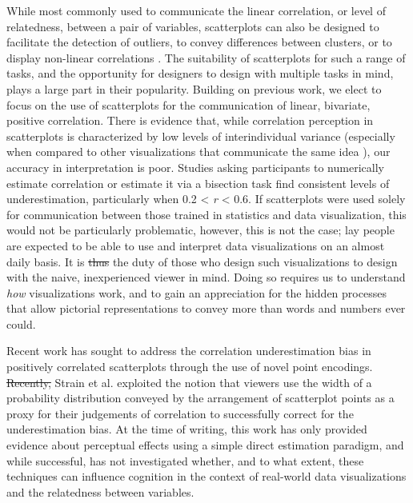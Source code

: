 \documentclass[manuscript,screen,review,anonymous]{acmart}
\providecommand{\DIFaddtex}[1]{{\protect\color{blue}\uwave{#1}}} %
\providecommand{\DIFdeltex}[1]{{\protect\color{red}\sout{#1}}} %
\providecommand{\DIFaddbegin}{} %
\providecommand{\DIFaddend}{} %
\providecommand{\DIFdelbegin}{} %
\providecommand{\DIFdelend}{} %
\providecommand{\DIFadd}[1]{\texorpdfstring{\DIFaddtex{#1}}{#1}} %
\providecommand{\DIFdel}[1]{\texorpdfstring{\DIFdeltex{#1}}{}} %
\newcommand{\DIFscaledelfig}{0.5}
\newlength{\DIFdelgraphicswidth} %
\newlength{\DIFdelgraphicsheight} %
\newcommand{\DIFaddincludegraphics}[2][]{{\color{blue}\fbox{\DIFOincludegraphics[#1]{#2}}}} %
\newcommand{\DIFdelincludegraphics}[2][]{%
\sbox{\DIFdelgraphicsbox}{\DIFOincludegraphics[#1]{#2}}%
\settoboxwidth{\DIFdelgraphicswidth}{\DIFdelgraphicsbox} %
\settoboxtotalheight{\DIFdelgraphicsheight}{\DIFdelgraphicsbox} %
\scalebox{\DIFscaledelfig}{%
\parbox[b]{\DIFdelgraphicswidth}{\usebox{\DIFdelgraphicsbox}\\[-\baselineskip] \rule{\DIFdelgraphicswidth}{0em}}\llap{\resizebox{\DIFdelgraphicswidth}{\DIFdelgraphicsheight}{%
\setlength{\unitlength}{\DIFdelgraphicswidth}%
\begin{picture}(1,1)%
\thicklines\linethickness{2pt} %
{\color[rgb]{1,0,0}\put(0,0){\framebox(1,1){}}}%
{\color[rgb]{1,0,0}\put(0,0){\line( 1,1){1}}}%
{\color[rgb]{1,0,0}\put(0,1){\line(1,-1){1}}}%
\end{picture}%
}\hspace*{3pt}}} %
} %
\DeclareRobustCommand{\DIFaddbegin}{\DIFOaddbegin \let\includegraphics\DIFaddincludegraphics} %
\DeclareRobustCommand{\DIFaddend}{\DIFOaddend \let\includegraphics\DIFOincludegraphics} %
\DeclareRobustCommand{\DIFdelbegin}{\DIFOdelbegin \let\includegraphics\DIFdelincludegraphics} %
\DeclareRobustCommand{\DIFdelend}{\DIFOaddend \let\includegraphics\DIFOincludegraphics} %
\begin{document}
While most commonly used to communicate the linear correlation, or level
of relatedness, between a pair of variables, scatterplots can also be
designed to facilitate the detection of outliers, to convey differences
between clusters, or to display non-linear correlations
\citep{sarikaya_2018}. The suitability of scatterplots for such a range
of tasks, and the opportunity for designers to design with multiple
tasks in mind, plays a large part in their popularity. Building on
previous work, we elect to focus on the use of scatterplots for the
communication of linear, bivariate, positive correlation. There is
evidence that, while correlation perception in scatterplots is
characterized by low levels of interindividual variance (especially when
compared to other visualizations that communicate the same idea
\citep{harrison_2014, kay_2015}), our accuracy in interpretation is
poor. Studies asking participants to numerically estimate correlation
\citep{strahan_1978, bobko_1979, cleveland_1982, lane_1985, lauer_1989, collyer_1990, meyer_1992}
or estimate it via a bisection task \citep{rensink_2017} find consistent
levels of underestimation, particularly when 0.2 \textless{} \emph{r}
\textless{} 0.6. If scatterplots were used solely for communication
between those trained in statistics and data visualization, this would
not be particularly problematic, however, this is not the case; lay
people are expected to be able to use and interpret data visualizations
on an almost daily basis. It is \DIFdelbegin \DIFdel{thus }\DIFdelend \DIFaddbegin \DIFadd{therefore }\DIFaddend the duty of those who design
such visualizations to design with the naive, inexperienced viewer in
mind. Doing so requires us to understand \emph{how} visualizations work,
and to gain an appreciation for the hidden processes that allow
pictorial representations to convey more than words and numbers ever
could.

Recent work has sought to address the correlation underestimation bias
in positively correlated scatterplots through the use of novel point
encodings. \DIFdelbegin \DIFdel{Recently, }\DIFdelend Strain et al. \citep{strain_2023, strain_2023b, strain_2024}
exploited the notion that viewers use the width of a probability
distribution conveyed by the arrangement of scatterplot points as a
proxy for their judgements of correlation to successfully correct for
the underestimation bias. At the time of writing, this work has only
provided evidence about perceptual effects using a simple direct
estimation paradigm, and while successful, has not investigated whether,
and to what extent, these techniques can influence cognition in the
context of real-world data visualizations and the relatedness between
variables.
\end{document}
